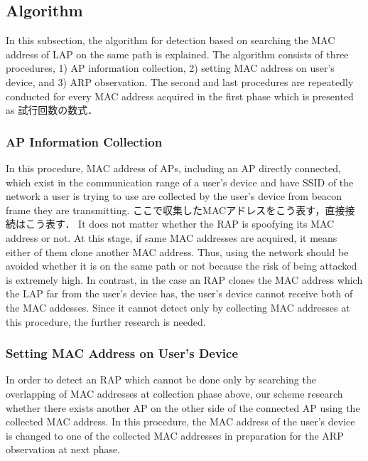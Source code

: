 \documentclass[conference]{IEEEtran}
\begin{document}
\subsection{Algorithm}
In this subsection, the algorithm for detection based on searching the MAC address of LAP on the same path is explained.
The algorithm consists of three procedures, 1) AP information collection, 2) setting MAC address on user's device, and 3) ARP observation.
The second and last procedures are repeatedly conducted for every MAC address acquired in the first phase which is presented as 試行回数の数式．
\subsubsection{AP Information Collection}
In this procedure, MAC address of APs, including an AP directly connected, which exist in the communication range of a user's device and have SSID of the network a user is trying to use are collected by the user's device from beacon frame they are transmitting.
ここで収集したMACアドレスをこう表す，直接接続はこう表す．
It does not matter whether the RAP is spoofying its MAC address or not.
At this stage, if same MAC addresses are acquired, it means either of them clone another MAC address.
Thus, using the network should be avoided whether it is on the same path or not because the risk of being attacked is extremely high. 
In contrast, in the case an RAP clones the MAC address which the LAP far from the user's device has, the user's device cannot receive both of the MAC addesses.
Since it cannot detect only by collecting MAC addresses at this procedure, the further research is needed.

\subsubsection{Setting MAC Address on User's Device}
In order to detect an RAP which cannot be done only by searching the overlapping of MAC addresses at collection phase above, our scheme research whether there exists another AP on the other side of the connected AP using the collected MAC address.
In this procedure, the MAC address of the user's device is changed to one of the collected MAC addresses in preparation for the ARP observation at next phase.
\end{document}
